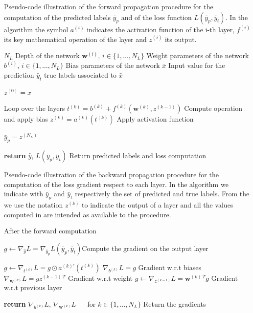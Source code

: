 \begin{algorithm}
\caption{Pseudo-code illustration of the forward propagation procedure for the computation of the predicted labels $\bar{y}_p$ and of the loss function $L(\bar{y}_p,\bar{y}_t)$. In the algorithm the symbol $a^{(i)}$ indicates the activation function of the i-th layer, $f^{(i)}$ its key mathematical operation of the layer and $z^{(i)}$ its output.}
\label{alg:fow_prop}
\begin{algorithmic}[1]
\Require $N_L$ \Comment Depth of the network
\Require $\mathbf{w}^{(i)}$, $i \in \{1,\dots,N_L\}$ \Comment Weight parameters of the network
\Require $b^{(i)}$, $i \in \{1,\dots,N_L\}$ \Comment Bias parameters of the network
\Require $\bar{x}$ \Comment Input value for the prediction
\Require $\bar{y}_t$ \Comment true labels associated to $\bar{x}$


\State $z^{(0)} = x$

 \Comment Loop over the layers
\State $t^{(k)} = b^{(k)} + f^{(k)}\left(\mathbf{w}^{(k)}, z^{(k-1)}\right)$ \Comment Compute operation and apply bias
\State $z^{(k)} = a^{(k)}(t^{(k)})$ \Comment Apply activation function
\EndFor

\State $\bar{y}_p = z^{(N_L)}$

\State \textbf{return} $\hat{y}$, $L(\bar{y}_p,\bar{y}_t)$ \Comment Return predicted labels and loss computation 
\EndProcedure
\end{algorithmic}
\end{algorithm}


\begin{algorithm}
\caption{Pseudo-code illustration of the backward propagation procedure for the computation of the loss gradient respect to each layer. In the algorithm we indicate with $\bar{y}_p$ and $\bar{y}_t$ respectively the set of predicted and true labels. From the  we use the notation $z^{(k)}$ to indicate the output of a layer and all the values computed in  are intended as available to the procedure.}
\label{alg:back_comp}
\begin{algorithmic}[1]

 \Comment After the forward computation

\State $g \gets \nabla_{\hat{y}}L = \nabla_{\bar{y}_p}L(\bar{y}_p,\bar{y}_t)$\Comment Compute the gradient on the output layer

\State $g \gets \nabla_{t^{(k)}}L = g \odot a^{(k)\prime}(t^{(k)})$
\State $\nabla_{b^{(k)}}L = g$ \Comment Gradient w.r.t biases
\State $\nabla_{\mathbf{w}^{(k)}}L = g z^{(k-1)~T}$ \Comment Gradient w.r.t weight
\State $g \gets \nabla_{z^{(k-1)}}L = \mathbf{w}^{(k)~T} g$ \Comment Gradient w.r.t previous layer
\EndFor

\State \textbf{return} $\nabla_{b^{(k)}}L$, $\nabla_{\mathbf{w}^{(k)}}L$ $\quad$ for $k \in \{1,\dots,N_L\}$ \Comment Return the gradients
\EndProcedure
\end{algorithmic}
\end{algorithm}



